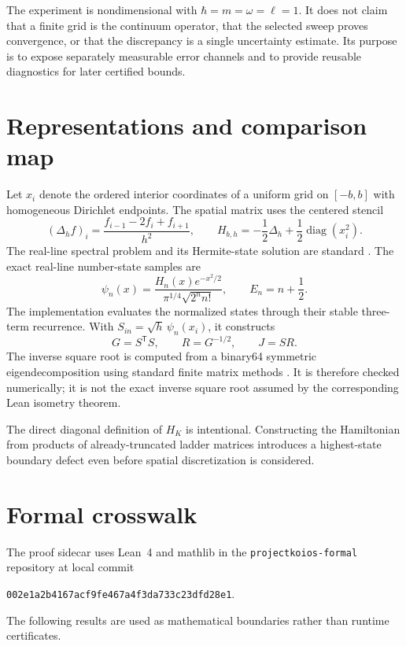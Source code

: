 \documentclass[11pt]{article}
\newcommand{\code}[1]{\texttt{#1}}
\begin{document}
The experiment is nondimensional with
$\hbar=m=\omega=\ell=1$.  It does not claim that a finite grid is the continuum
operator, that the selected sweep proves convergence, or that the discrepancy is a
single uncertainty estimate.  Its purpose is to expose separately measurable error
channels and to provide reusable diagnostics for later certified bounds.

\section{Representations and comparison map}

Let $x_i$ denote the ordered interior coordinates of a uniform grid on $[-b,b]$ with
homogeneous Dirichlet endpoints.  The spatial matrix uses the centered stencil
\begin{equation}
  (\Delta_h f)_i=\frac{f_{i-1}-2f_i+f_{i+1}}{h^2},
  \qquad
  H_{b,h}=-\frac12\Delta_h+\frac12\operatorname{diag}(x_i^2).
\end{equation}
The real-line spectral problem and its Hermite-state solution are standard
\cite{shankar1994,teschl2014}. The exact real-line number-state samples are
\begin{equation}
  \psi_n(x)=\frac{H_n(x)e^{-x^2/2}}{\pi^{1/4}\sqrt{2^n n!}},
  \qquad E_n=n+\frac12.
\end{equation}
The implementation evaluates the normalized states through their stable three-term
recurrence.  With $S_{in}=\sqrt{h}\,\psi_n(x_i)$, it constructs
\begin{equation}
  G=S^{\mathsf T}S,\qquad R=G^{-1/2},\qquad J=SR.
  \label{eq:gram-map}
\end{equation}
The inverse square root is computed from a binary64 symmetric eigendecomposition using
standard finite matrix methods \cite{golubVanLoan2013}. It is therefore checked
numerically; it is not the exact inverse square root assumed by the corresponding Lean
isometry theorem.

The direct diagonal definition of $H_K$ is intentional.  Constructing the Hamiltonian
from products of already-truncated ladder matrices introduces a highest-state boundary
defect even before spatial discretization is considered.

\section{Formal crosswalk}

The proof sidecar uses Lean~4 and mathlib
\cite{demouraUllrich2021,mathlib2020} in the \code{projectkoios-formal} repository at
local commit
\begin{center}
\small\code{002e1a2b4167acf9fe467a4f3da733c23dfd28e1}.
\end{center}
The following results are used as mathematical boundaries rather than runtime
certificates.
\end{document}
